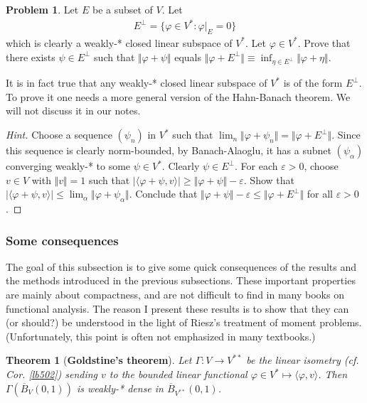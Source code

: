 \documentclass[12pt,b5paper,notitlepage]{article}
\theoremstyle{definition}
\newtheorem{prob}{\color{red}Problem}[section]
\theoremstyle{plain}
\newtheorem{thm}[df]{Theorem}
\newcommand{\ovl}{\overline}
\newcommand{\bk}[1]{\langle {#1}\rangle}
\newcommand{\eps}{\varepsilon}
\numberwithin{equation}{section}
\begin{document}
\begin{prob}\label{lb564}
Let $E$ be a subset of $V$. Let
\begin{align}
E^\perp=\{\varphi\in V^*:\varphi|_E=0\}
\end{align}
which is clearly a weakly-* closed linear subspace of $V^*$. Let $\varphi\in V^*$. Prove that there exists $\psi\in E^\perp$ such that $\Vert\varphi+\psi\Vert$ equals $\Vert\varphi+E^\perp\Vert\equiv\inf_{\eta\in E^\perp}\Vert\varphi+\eta\Vert$.
\end{prob}

It is in fact true that any weakly-* closed linear subspace of $V^*$ is of the form $E^\perp$. To prove it one needs a more general version of the Hahn-Banach theorem. We will not discuss it in our notes.

\begin{proof}[Hint]
Choose a sequence $(\psi_n)$ in $V^*$ such that  $\lim_n\Vert \varphi+\psi_n\Vert=\Vert \varphi+E^\perp\Vert$. Since this sequence is clearly norm-bounded, by Banach-Alaoglu, it has a subnet $(\psi_\alpha)$ converging weakly-* to some $\psi\in V^*$. Clearly $\psi\in E^\perp$. For each $\eps>0$, choose $v\in V$ with $\Vert v\Vert=1$ such that $|\bk{\varphi+\psi,v}|\geq \Vert\varphi+\psi\Vert-\eps$. Show that $|\bk{\varphi+\psi,v}|\leq \lim_\alpha\Vert\varphi+\psi_\alpha\Vert$. Conclude that $\Vert\varphi+\psi\Vert-\eps\leq\Vert\varphi+E^\perp\Vert$ for all $\eps>0$.
\end{proof}







\subsubsection{Some consequences}


The goal of this subsection is to give some quick consequences of the results and the methods introduced in the previous subsections. These important properties are mainly about compactness, and are not difficult to find in many books on functional analysis. The reason I present these results is to show that they can (or should?) be understood in the light of Riesz's treatment of moment problems. (Unfortunately, this point is often not emphasized in many textbooks.)



\begin{thm}[\textbf{Goldstine's theorem}] \label{lb568}
Let $\Gamma:V\rightarrow V^{**}$ be the linear isometry (cf. Cor. \ref{lb502}) sending $v$ to the bounded linear functional $\varphi\in V^*\mapsto\bk{\varphi,v}$. Then $\Gamma(\ovl B_V(0,1))$ is weakly-* dense in $\ovl B_{V^{**}}(0,1)$. 
\end{thm}
\end{document}
